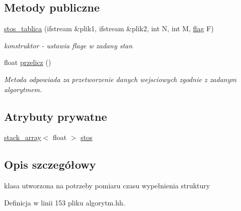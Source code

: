 \subsection*{\-Metody publiczne}
\begin{DoxyCompactItemize}
\item 
\hyperlink{classstos__tablica_a74b6909e896922fd4ebb355e1e996523}{stos\-\_\-tablica} (ifstream \&plik1, ifstream \&plik2, int \-N, int \-M, \hyperlink{stos_8hh_a7847560c748814fd3070e9149a9578bd}{flag} \-F)
\begin{DoxyCompactList}\small\item\em konstruktor -\/ ustawia flage w zadany stan \end{DoxyCompactList}\item 
float \hyperlink{classstos__tablica_a44ec89c9723d4034e46ae3b51b01faea}{przelicz} ()
\begin{DoxyCompactList}\small\item\em \-Metoda odpowiada za przetworzenie danych wejsciowych zgodnie z zadanym algorytmem. \end{DoxyCompactList}\end{DoxyCompactItemize}
\subsection*{\-Atrybuty prywatne}
\begin{DoxyCompactItemize}
\item 
\hyperlink{classstack__array}{stack\-\_\-array}$<$ float $>$ \hyperlink{classstos__tablica_a8aa72aa52bd2436cb12d9e1c8e077389}{stos}
\end{DoxyCompactItemize}


\subsection{\-Opis szczegółowy}
klasa utworzona na potrzeby pomiaru czasu wypełnienia struktury 

\-Definicja w linii 153 pliku algorytm.\-hh.



